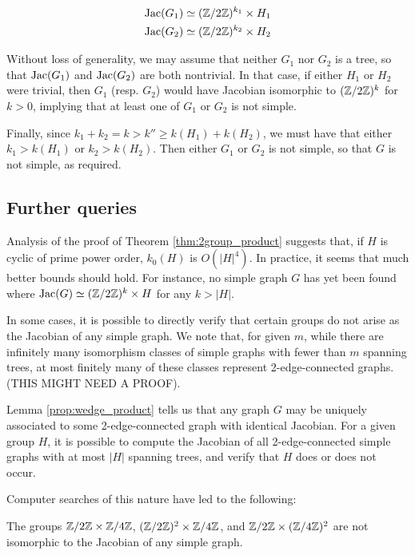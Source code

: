 \documentclass{amsart}
\begin{document}
\begin{align}
  \operatorname{Jac}(G_1) &\simeq (\mathbb{Z}/2\mathbb{Z})^{k_1} \times H_1 \\
  \operatorname{Jac}(G_2) &\simeq (\mathbb{Z}/2\mathbb{Z})^{k_2} \times H_2
\end{align}

Without loss of generality, we may assume that neither $G_1$ nor $G_2$
is a tree, so that $\operatorname{Jac}(G_1)$ and $\operatorname{Jac}(G_2)$ are both nontrivial. In
that case, if either $H_1$ or $H_2$ were trivial, then $G_1$
(resp. $G_2$) would have Jacobian isomorphic to $(\mathbb{Z}/2\mathbb{Z})^k$ for $k >
0$, implying that at least one of $G_1$ or $G_2$ is not simple.

Finally, since $k_1 + k_2 = k > k'' \ge k(H_1) + k(H_2)$, we must have
that either $k_1 > k(H_1)$ or $k_2 > k(H_2)$. Then either $G_1$ or
$G_2$ is not simple, so that $G$ is not simple, as required.

\subsection{Further queries} 

Analysis of the proof of Theorem \ref{thm:2group_product} suggests
that, if $H$ is cyclic of prime power order, $k_0(H)$ is
$O(|H|^4)$. In practice, it seems that much better bounds should
hold. For instance, no simple graph $G$ has yet been found where
$\operatorname{Jac}(G) \simeq (\mathbb{Z}/2\mathbb{Z})^k \times H$ for any $k > |H|$.

In some cases, it is possible to directly verify that certain groups
do not arise as the Jacobian of any simple graph. We note that, for
given $m$, while there are infinitely many isomorphism classes of
simple graphs with fewer than $m$ spanning trees, at most finitely
many of these classes represent 2-edge-connected graphs. (THIS MIGHT
NEED A PROOF).

Lemma \ref{prop:wedge_product} tells us that any graph $G$ may be
uniquely associated to some 2-edge-connected graph with identical
Jacobian. For a given group $H$, it is possible to compute the
Jacobian of all 2-edge-connected simple graphs with at most $|H|$
spanning trees, and verify that $H$ does or does not occur. 

Computer searches of this nature have led to the following:

\begin{thm}
  The groups $\mathbb{Z}/2\mathbb{Z} \times \mathbb{Z}/4\mathbb{Z}$, $(\mathbb{Z}/2\mathbb{Z})^2 \times \mathbb{Z}/4\mathbb{Z}$, and
  $\mathbb{Z}/2\mathbb{Z} \times (\mathbb{Z}/4\mathbb{Z})^2$ are not isomorphic to the Jacobian of any
  simple graph.
\end{thm}
\end{document}
